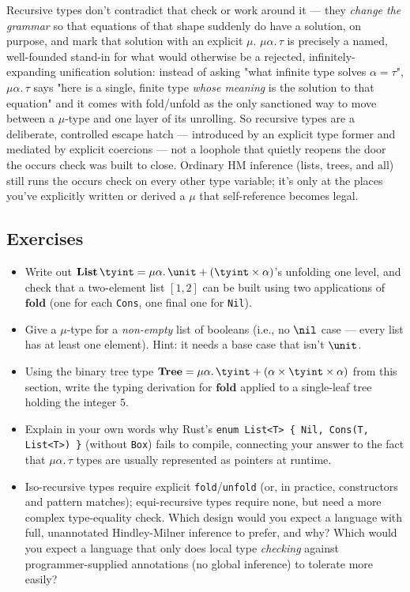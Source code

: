 Recursive types don't contradict that check or work around it — they \emph{change the grammar} so that equations of that shape suddenly do have a solution, on purpose, and mark that solution with an explicit $\mu$. $\mu\alpha.\,\tau$ is precisely a named, well-founded stand-in for what would otherwise be a rejected, infinitely-expanding unification solution: instead of asking "what infinite type solves $\alpha = \tau$", $\mu\alpha.\,\tau$ says "here is a single, finite type \emph{whose meaning} is the solution to that equation" and it comes with fold/unfold as the only sanctioned way to move between a $\mu$-type and one layer of its unrolling. So recursive types are a deliberate, controlled escape hatch — introduced by an explicit type former and mediated by explicit coercions — not a loophole that quietly reopens the door the occurs check was built to close. Ordinary HM inference (lists, trees, and all) still runs the occurs check on every other type variable; it's only at the places you've explicitly written or derived a $\mu$ that self-reference becomes legal.

\subsection{Exercises}
\begin{itemize}
  \item Write out $\mathbf{List}\,\tyint = \mu\alpha.\,\unit + (\tyint\times\alpha)$'s unfolding one level, and check that a two-element list $[1,2]$ can be built using two applications of $\mathbf{fold}$ (one for each \lstinline|Cons|, one final one for \lstinline|Nil|).
  \item Give a $\mu$-type for a \emph{non-empty} list of booleans (i.e., no $\nil$ case — every list has at least one element). Hint: it needs a base case that isn't $\unit$.
  \item Using the binary tree type $\mathbf{Tree} = \mu\alpha.\,\tyint + (\alpha\times\tyint\times\alpha)$ from this section, write the typing derivation for $\mathbf{fold}$ applied to a single-leaf tree holding the integer $5$.
  \item Explain in your own words why Rust's \lstinline|enum List<T> { Nil, Cons(T, List<T>) }| (without \lstinline|Box|) fails to compile, connecting your answer to the fact that $\mu\alpha.\,\tau$ types are usually represented as pointers at runtime.
  \item Iso-recursive types require explicit \lstinline|fold|/\lstinline|unfold| (or, in practice, constructors and pattern matches); equi-recursive types require none, but need a more complex type-equality check. Which design would you expect a language with full, unannotated Hindley-Milner inference to prefer, and why? Which would you expect a language that only does local type \emph{checking} against programmer-supplied annotations (no global inference) to tolerate more easily?
\end{itemize}
